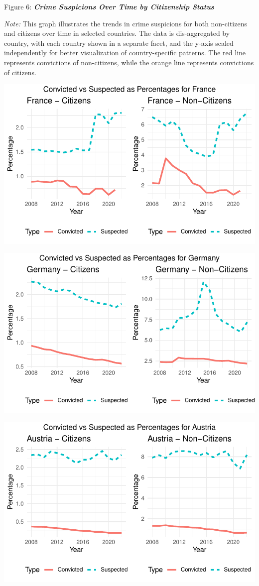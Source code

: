 \documentclass[
]{article}
\begin{document}
Figure 6: \textbf{\emph{Crime Suspicions Over Time by Citizenship
Status}}

\emph{Note:} This graph illustrates the trends in crime suspicions for
both non-citizens and citizens over time in selected countries. The data
is dis-aggregated by country, with each country shown in a separate
facet, and the y-axis scaled independently for better visualization of
country-specific patterns. The red line represents convictions of
non-citizens, while the orange line represents convictions of citizens.

\includegraphics{DataMan_Project_files/figure-pdf/unnamed-chunk-30-1.pdf}

\includegraphics{DataMan_Project_files/figure-pdf/unnamed-chunk-30-2.pdf}

\includegraphics{DataMan_Project_files/figure-pdf/unnamed-chunk-30-3.pdf}
\end{document}

